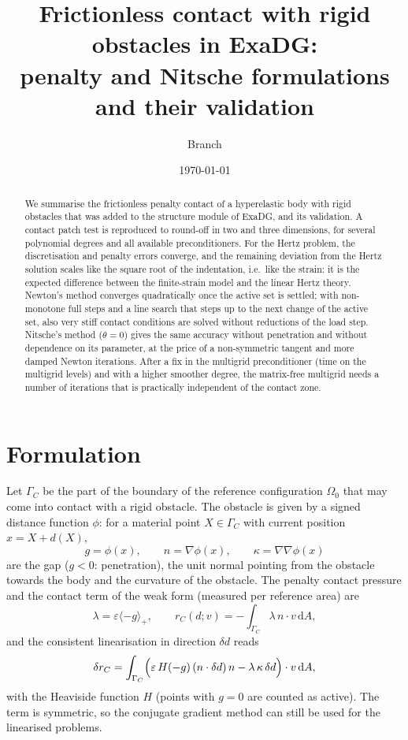 \documentclass[11pt,a4paper]{article}
\title{Frictionless contact with rigid obstacles in ExaDG:\\
penalty and Nitsche formulations and their validation}
\author{Branch \code{structure-contact}}
\date{\today}
\newcommand{\dd}{\,\mathrm{d}}
\newcommand{\pos}[1]{\langle #1\rangle_{+}}
\begin{document}
\maketitle

\begin{abstract}
  We summarise the frictionless penalty contact of a hyperelastic body with rigid obstacles that
  was added to the structure module of ExaDG, and its validation. A contact patch test is
  reproduced to round-off in two and three dimensions, for several polynomial degrees and all
  available preconditioners. For the Hertz problem, the discretisation and penalty errors
  converge, and the remaining deviation from the Hertz solution scales like the square root of
  the indentation, i.e.\ like the strain: it is the expected difference between the finite-strain
  model and the linear Hertz theory. Newton's method converges quadratically once the active set
  is settled; with non-monotone full steps and a line search that steps up to the next change of the
  active set, also very stiff contact conditions are solved without reductions of the load step. Nitsche's method ($\theta=0$) gives the same accuracy without penetration and
  without dependence on its parameter, at the price of a non-symmetric tangent and more damped
  Newton iterations. After a fix in the multigrid preconditioner (time on the multigrid levels) and
  with a higher smoother degree, the matrix-free multigrid needs a number of iterations that is
  practically independent of the contact zone.
\end{abstract}

\section{Formulation}

Let $\Gamma_C$ be the part of the boundary of the reference configuration $\Omega_0$ that may come
into contact with a rigid obstacle. The obstacle is given by a signed distance function $\phi$:
for a material point $X\in\Gamma_C$ with current position $x = X + d(X)$,
\begin{equation}
  g = \phi(x), \qquad n = \nabla\phi(x), \qquad \kappa = \nabla\nabla\phi(x)
\end{equation}
are the gap ($g<0$: penetration), the unit normal pointing from the obstacle towards the body and
the curvature of the obstacle. The penalty contact pressure and the contact term of the weak form
(measured per reference area) are
\begin{equation}
  \lambda = \varepsilon \pos{-g}, \qquad
  r_C(d; v) = -\int_{\Gamma_C} \lambda\, n\cdot v \dd A ,
\end{equation}
and the consistent linearisation in direction $\delta d$ reads
\begin{equation}
  \delta r_C = \int_{\Gamma_C} \Bigl(\varepsilon\, H(-g)\,(n\cdot\delta d)\, n
  - \lambda\, \kappa\, \delta d\Bigr)\cdot v \dd A ,
\end{equation}
with the Heaviside function $H$ (points with $g=0$ are counted as active). The term is symmetric,
so the conjugate gradient method can still be used for the linearised problems.
\end{document}
